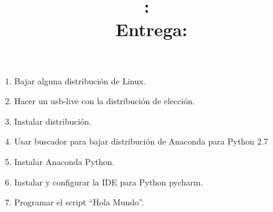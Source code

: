 \documentclass{article}
\title{
	\vspace{2in}
	\textmd{\textbf{\hmwkClass:\ \hmwkTitle}}\\
	\normalsize\vspace{0.1in}\small{Entrega: \hmwkDueDate}\\
	\vspace{0.1in}\large{\textit{\hmwkClassInstructor}}
	\vspace{3in}
}
\author{\textbf{\hmwkAuthorName}}
\date{} %
\begin{document}
	\maketitle

	\newpage



	\begin{enumerate}
		\item
			Bajar alguna distribuci\'on de Linux.
		\item
			Hacer un usb-live con la distribuci\'on de elecci\'on.
		\item
			Instalar distribuci\'on.
		\item
			Usar buscador para bajar distribuci\'on de Anaconda para 
			Python 2.7
		\item
			Instalar Anaconda Python.
		\item
			Instalar y configurar la IDE para Python pycharm.
		\item
			Programar el script ``Hola Mundo''.
	\end{enumerate}
\end{document}
